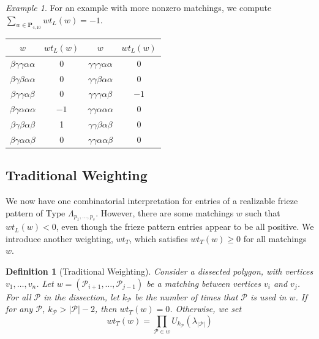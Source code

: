 \documentclass[12pt]{article}
\newtheorem{definition}{Definition}
\theoremstyle{remark}
\newtheorem{example}{Example}
\newcommand*{\pathset}[2]{\mathbf{P}_{#1,#2}}
\newcommand*{\poly}[1]{\mathcal{P}_{#1}}
\begin{document}
\begin{example}
 For an example with more nonzero matchings, we compute $\sum_{w \in \pathset{4}{10}} wt_L(w) = -1$.
 
 \begin{center}
 \begin{tabular}{c|c||c|c}
     $w$ & $wt_L(w)$& $w$ & $wt_L(w)$ \\\hline
    $\beta\gamma\gamma\alpha\alpha$  & 0 & $\gamma\gamma\gamma\alpha\alpha$  & 0\\
    $\beta\gamma\beta\alpha\alpha$  & 0 & $\gamma\gamma\beta\alpha\alpha$  & 0\\
    $\beta\gamma\gamma\alpha\beta$  & 0 & $\gamma\gamma\gamma\alpha\beta$  & $-1$\\ $\beta\gamma\alpha\alpha\alpha$  & $-1$ & $\gamma\gamma\alpha\alpha\alpha$  & 0\\ 
    $\beta\gamma\beta\alpha\beta$  & 1 & $\gamma\gamma\beta\alpha\beta$  & 0\\
    $\beta\gamma\alpha\alpha\beta$  & 0 & $\gamma\gamma\alpha\alpha\beta$  & 0\\ 
 \end{tabular}
 \end{center}
\end{example}

\subsection{Traditional Weighting}

We now have one combinatorial interpretation for entries of a realizable frieze pattern of Type $\Lambda_{p_1,\ldots,p_s}$. However, there are some matchings $w$ such that $wt_L(w) < 0$, even though the frieze pattern entries appear to be all positive. We introduce another weighting, $wt_T$, which satisfies $wt_T(w) \geq 0$ for all matchings $w$. 


\begin{definition}[Traditional Weighting]\label{def:TradWeight}
Consider a dissected polygon, with vertices $v_1,\ldots,v_n$. Let $w = (\poly{i+1},\ldots,\poly{j-1})$ be a matching between vertices $v_i$ and $v_j$. For all $\mathcal{P}$ in the dissection, let $k_{\mathcal{P}}$ be the number of times that $\mathcal{P}$ is used in $w$. If for any $\mathcal{P}$, $k_{\mathcal{P}} > \vert \mathcal{P} \vert - 2$, then $wt_T(w) = 0$. Otherwise, we set\[
wt_T(w) = \prod_{\mathcal{P} \in w} U_{k_{\mathcal{P}}} (\lambda_{\vert \mathcal{P} \vert})
\]
\end{definition}
\end{document}
